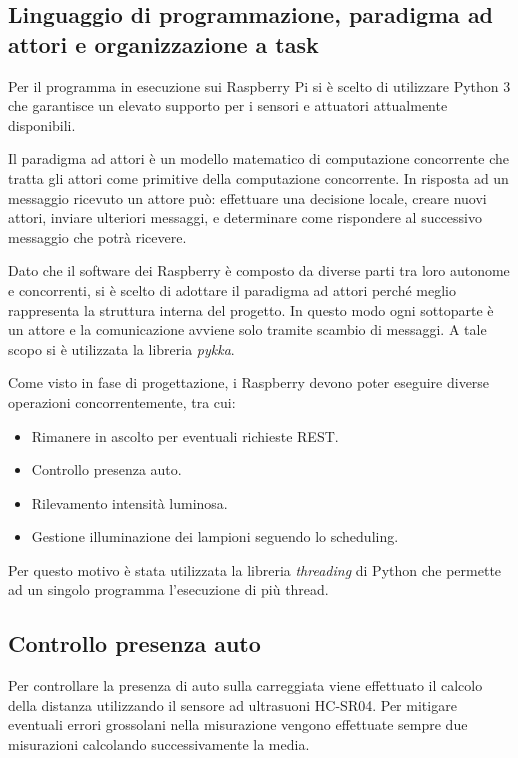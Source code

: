 \subsection{Linguaggio di programmazione, paradigma ad attori e organizzazione a task}

Per il programma in esecuzione sui Raspberry Pi si è scelto di utilizzare Python 3 che garantisce un elevato supporto per i sensori e attuatori attualmente disponibili.

Il paradigma ad attori è un modello matematico di computazione concorrente che tratta gli attori come primitive della computazione concorrente.
In risposta ad un messaggio ricevuto un attore può: effettuare una decisione locale, creare nuovi attori, inviare ulteriori messaggi, e determinare come rispondere al successivo messaggio che potrà ricevere. 

Dato che il software dei Raspberry è composto da diverse parti tra loro autonome e concorrenti, si è scelto di adottare il paradigma ad attori perché meglio rappresenta la struttura interna del progetto.
In questo modo ogni sottoparte è un attore e la comunicazione avviene solo tramite scambio di messaggi.
A tale scopo si è utilizzata la libreria \textit{pykka}.

Come visto in fase di progettazione, i Raspberry devono poter eseguire diverse operazioni concorrentemente, tra cui:

\begin{itemize}
	\item Rimanere in ascolto per eventuali richieste REST.
	\item Controllo presenza auto.
	\item Rilevamento intensità luminosa.
	\item Gestione illuminazione dei lampioni seguendo lo scheduling.
\end{itemize}

Per questo motivo è stata utilizzata la libreria \textit{threading} di Python che permette ad un singolo programma l'esecuzione di più thread.

\subsection{Controllo presenza auto \label{cpa}}

Per controllare la presenza di auto sulla carreggiata viene effettuato il calcolo della distanza utilizzando il sensore ad ultrasuoni HC-SR04. Per mitigare eventuali errori grossolani nella misurazione vengono effettuate sempre due misurazioni calcolando successivamente la media.

